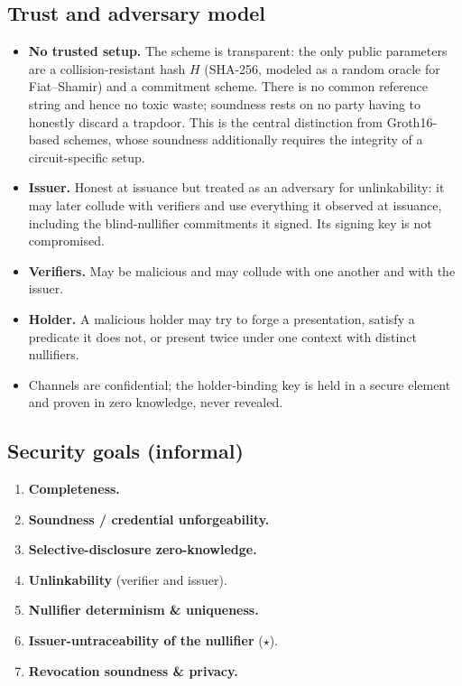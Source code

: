 \documentclass[11pt]{article}
\theoremstyle{plain}
\theoremstyle{definition}
\begin{document}
\subsection{Trust and adversary model}
\begin{itemize}
\item \textbf{No trusted setup.} The scheme is transparent: the only public
parameters are a collision-resistant hash $H$ (SHA-256, modeled as a random oracle for
Fiat--Shamir) and a commitment scheme. There is no common reference string and hence
no toxic waste; soundness rests on no party having to honestly discard a trapdoor.
This is the central distinction from Groth16-based schemes, whose soundness
additionally requires the integrity of a circuit-specific setup.
\item \textbf{Issuer.} Honest at issuance but treated as an adversary for
unlinkability: it may later collude with verifiers and use everything it observed at
issuance, including the blind-nullifier commitments it signed. Its signing key is not
compromised.
\item \textbf{Verifiers.} May be malicious and may collude with one another and with
the issuer.
\item \textbf{Holder.} A malicious holder may try to forge a presentation, satisfy a
predicate it does not, or present twice under one context with distinct nullifiers.
\item Channels are confidential; the holder-binding key is held in a secure element
and proven in zero knowledge, never revealed.
\end{itemize}

\subsection{Security goals (informal)}\label{sec:goals}
\begin{enumerate}
\item \textbf{Completeness.}
\item \textbf{Soundness / credential unforgeability.}
\item \textbf{Selective-disclosure zero-knowledge.}
\item \textbf{Unlinkability} (verifier and issuer).
\item \textbf{Nullifier determinism \& uniqueness.}
\item \textbf{Issuer-untraceability of the nullifier} ($\star$).
\item \textbf{Revocation soundness \& privacy.}
\end{enumerate}
\end{document}
